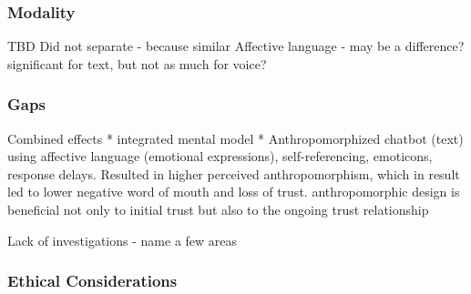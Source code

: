 \documentclass[sigconf,screen,review, anonymous]{acmart}
\newcommand{\cmt}[1]{}%
\begin{document}




\subsubsection{Modality}

TBD 
Did not separate - because similar 
Affective language - may be a difference? significant for text, but not as much for voice?


\subsubsection{Gaps}

Combined effects
* integrated mental model \cite{knijnenburg2016inferring}\cmt{[34]}
* Anthropomorphized chatbot (text) using affective language (emotional expressions), self-referencing, emoticons, response delays. Resulted in higher perceived anthropomorphism, which in result led to lower negative word of mouth and loss of trust. anthropomorphic design is beneficial not only to initial trust but also to the ongoing trust relationship \cite{seeger2021chatbots}\cmt{[35]}

Lack of investigations - name a few areas



\subsubsection{Ethical Considerations}
\end{document}
